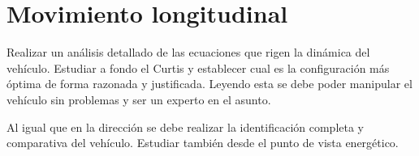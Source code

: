 \chapter{Movimiento longitudinal}
Realizar un análisis detallado de las ecuaciones que rigen la dinámica del vehículo. Estudiar a fondo el Curtis y establecer cual es la configuración más óptima de forma razonada y justificada. Leyendo esta se debe poder manipular el vehículo sin problemas y ser un experto en el asunto.

Al igual que en la dirección se debe realizar la identificación completa y comparativa del vehículo. Estudiar también desde el punto de vista energético.
\afterpage{\blankpage}
